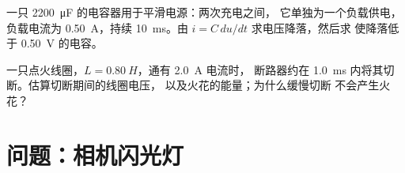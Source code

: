 \begin{exercise}[$\star\star\star$]\label{exo:g12:rc-rl-circuits:14}
一只 \qty{2200}{\micro F} 的电容器用于平滑电源：两次充电之间，
它单独为一个负载供电，负载电流为 \qty{0.50}{A}，持续 \qty{10}{ms}。由
$i = C\,du/dt$ 求电压降落，然后求
使降落低于 \qty{0.50}{V} 的电容。
\end{exercise}

\begin{exercise}[$\star\star\star$]\label{exo:g12:rc-rl-circuits:15}
一只点火线圈，$L = \qty{0.80}{H}$，通有 \qty{2.0}{A} 电流时，
断路器约在 \qty{1.0}{ms} 内将其切断。估算切断期间的线圈电压，
以及火花的能量；为什么缓慢切断
不会产生火花？
\end{exercise}

\section{问题：相机闪光灯}

